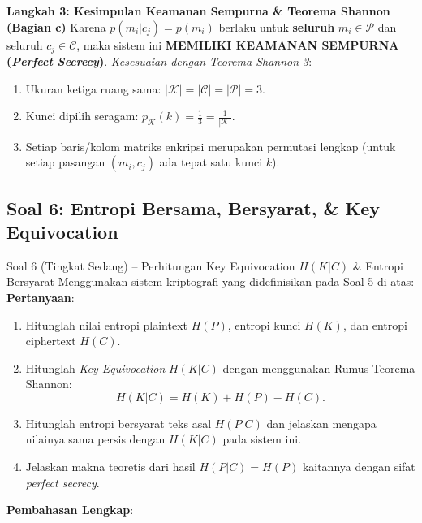 \documentclass[11pt,a4paper]{article}
\begin{document}
\noindent\textbf{Langkah 3: Kesimpulan Keamanan Sempurna \& Teorema Shannon (Bagian c)}
Karena $p(m_i | c_j) = p(m_i)$ berlaku untuk \textbf{seluruh} $m_i \in \mathcal{P}$ dan seluruh $c_j \in \mathcal{C}$, maka sistem ini \textbf{MEMILIKI KEAMANAN SEMPURNA (\textit{Perfect Secrecy})}.
\textit{Kesesuaian dengan Teorema Shannon 3}:
\begin{enumerate}
    \item Ukuran ketiga ruang sama: $|\mathcal{K}| = |\mathcal{C}| = |\mathcal{P}| = 3$.
    \item Kunci dipilih seragam: $p_{\mathcal{K}}(k) = \frac{1}{3} = \frac{1}{|\mathcal{K}|}$.
    \item Setiap baris/kolom matriks enkripsi merupakan permutasi lengkap (untuk setiap pasangan $(m_i, c_j)$ ada tepat satu kunci $k$).
\end{enumerate}

\vspace{0.4cm}

\subsection{Soal 6: Entropi Bersama, Bersyarat, \& Key Equivocation}

\begin{soalsedang}{Soal 6 (Tingkat Sedang) -- Perhitungan Key Equivocation $H(K|C)$ \& Entropi Bersyarat}
Menggunakan sistem kriptografi yang didefinisikan pada Soal 5 di atas:
\textbf{Pertanyaan}:
\begin{enumerate}[label=\alph*)]
    \item Hitunglah nilai entropi plaintext $H(P)$, entropi kunci $H(K)$, dan entropi ciphertext $H(C)$.
    \item Hitunglah \textit{Key Equivocation} $H(K|C)$ dengan menggunakan Rumus Teorema Shannon:
    \[
    H(K|C) = H(K) + H(P) - H(C).
    \]
    \item Hitunglah entropi bersyarat teks asal $H(P|C)$ dan jelaskan mengapa nilainya sama persis dengan $H(K|C)$ pada sistem ini.
    \item Jelaskan makna teoretis dari hasil $H(P|C) = H(P)$ kaitannya dengan sifat \textit{perfect secrecy}.
\end{enumerate}
\end{soalsedang}

\noindent\textbf{Pembahasan Lengkap}:
\end{document}
